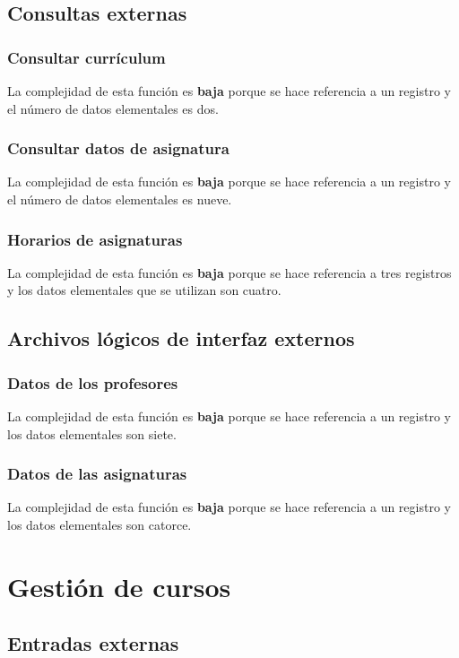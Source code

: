 \documentclass[11pt,a4paper,spanish,twoside]{book}
\begin{document}
\subsection{Consultas externas}
\subsubsection{Consultar currículum}
La complejidad de esta función es \textbf{baja} porque se hace referencia a
un registro y el número de datos elementales es dos.

\subsubsection{Consultar datos de asignatura} 
La complejidad de esta función es \textbf{baja} porque se hace referencia a
un registro y el número de datos elementales es nueve.

\subsubsection{Horarios de asignaturas}
La complejidad de esta función es \textbf{baja} porque se hace referencia a
tres registros y los datos elementales que se utilizan son cuatro.

\subsection{Archivos lógicos de interfaz externos}
\subsubsection{Datos de los profesores}
La complejidad de esta función es \textbf{baja} porque se hace referencia a
un registro y los datos elementales son siete.

\subsubsection{Datos de las asignaturas}
La complejidad de esta función es \textbf{baja} porque se hace referencia a
un registro y los datos elementales son catorce.

\section{Gestión de cursos}
\subsection{Entradas externas}
\end{document}
